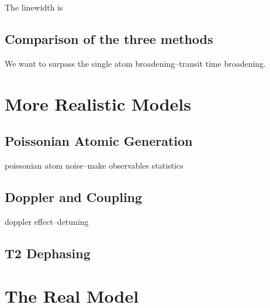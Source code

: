 \documentclass{article}
\begin{document}
The linewidth is

\subsection{Comparison of the three methods}
We want to surpass the single atom broadening--transit time broadening.

\section{More Realistic Models}
\label{section:realistic}

\subsection{Poissonian Atomic Generation}
poissonian atom noise--make observables statistics

\subsection{Doppler and Coupling}

doppler effect--detuning
\subsection{T2 Dephasing}



\section{The Real Model}
\label{section:real}
\end{document}
